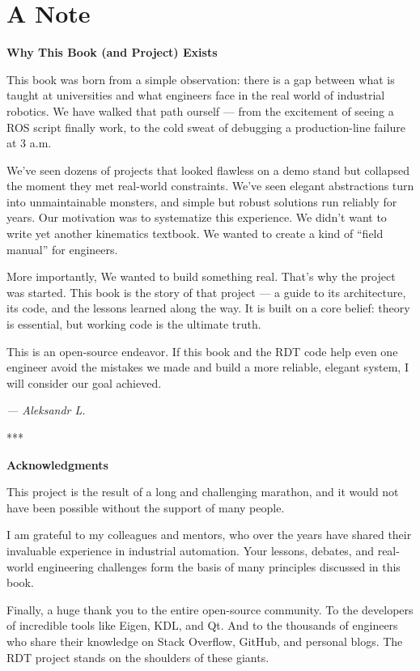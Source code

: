\newpage

\chapter*{A Note}

\textbf{Why This Book (and Project) Exists}

This book was born from a simple observation: there is a gap between what is taught at universities and what engineers face in the real world of industrial robotics. We have walked that path ourself — from the excitement of seeing a ROS script finally work, to the cold sweat of debugging a production-line failure at 3 a.m.

We’ve seen dozens of projects that looked flawless on a demo stand but collapsed the moment they met real-world constraints. We’ve seen elegant abstractions turn into unmaintainable monsters, and simple but robust solutions run reliably for years. Our motivation was to systematize this experience. We didn’t want to write yet another kinematics textbook. We wanted to create a kind of “field manual” for engineers.

More importantly, We wanted to build something real. That’s why the  project was started. This book is the story of that project — a guide to its architecture, its code, and the lessons learned along the way. It is built on a core belief: theory is essential, but working code is the ultimate truth.

This is an open-source endeavor. If this book and the RDT code help even one engineer avoid the mistakes we made and build a more reliable, elegant system, I will consider our goal achieved.

\begin{flushright}
    \textit{— Aleksandr L.}
\end{flushright}

\begin{center}
    ***
\end{center}
\vspace{1ex}

\textbf{Acknowledgments}

This project is the result of a long and challenging marathon, and it would not have been possible without the support of many people.

I am grateful to my colleagues and mentors, who over the years have shared their invaluable experience in industrial automation. Your lessons, debates, and real-world engineering challenges form the basis of many principles discussed in this book.

Finally, a huge thank you to the entire open-source community. To the developers of incredible tools like Eigen, KDL, and Qt. And to the thousands of engineers who share their knowledge on Stack Overflow, GitHub, and personal blogs. The RDT project stands on the shoulders of these giants.